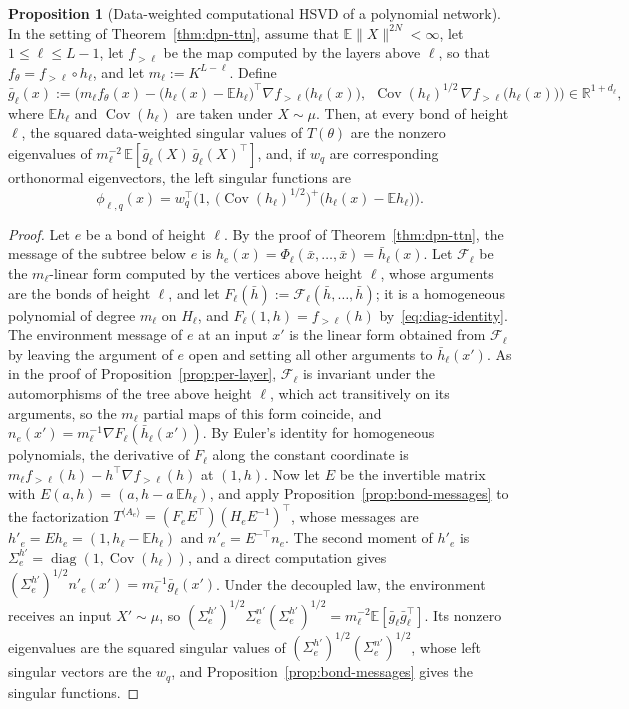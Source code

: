 \documentclass[11pt]{article}
\newcommand{\diag}{\operatorname{diag}}
\newcommand{\R}{\mathbb{R}}
\newcommand{\E}{\mathbb{E}}
\newcommand{\norm}[1]{\lVert #1\rVert}
\newcommand{\xb}{\bar{x}}
\newcommand{\hb}{\bar{h}}
\newcommand{\Cov}{\operatorname{Cov}}
\theoremstyle{definition}
\newtheorem{proposition}[theorem]{Proposition}
\numberwithin{equation}{section}
\begin{document}
\begin{proposition}[Data-weighted computational HSVD of a polynomial network]\label{prop:dpn-agop}
In the setting of Theorem~\ref{thm:dpn-ttn}, assume that $\E\norm{X}^{2N}<\infty$, let $1\le\ell\le L-1$, let $f_{>\ell}$ be the map computed by the layers above $\ell$, so that $f_\theta=f_{>\ell}\circ h_\ell$, and let $m_\ell:=K^{L-\ell}$. Define
\[
\bar g_\ell(x):=\Big(m_\ell f_\theta(x)-\big(h_\ell(x)-\E h_\ell\big)^\top\nabla f_{>\ell}\big(h_\ell(x)\big),\ \ \Cov(h_\ell)^{1/2}\,\nabla f_{>\ell}\big(h_\ell(x)\big)\Big)\in\R^{1+d_\ell},
\]
where $\E h_\ell$ and $\Cov(h_\ell)$ are taken under $X\sim\mu$. Then, at every bond of height $\ell$, the squared data-weighted singular values of $T(\theta)$ are the nonzero eigenvalues of $m_\ell^{-2}\,\E[\bar g_\ell(X)\,\bar g_\ell(X)^\top]$, and, if $w_q$ are corresponding orthonormal eigenvectors, the left singular functions are
\[
\phi_{\ell,q}(x)=w_q^\top\Big(1,\ \big(\Cov(h_\ell)^{1/2}\big)^+\big(h_\ell(x)-\E h_\ell\big)\Big).
\]
\end{proposition}

\begin{proof}
Let $e$ be a bond of height $\ell$. By the proof of Theorem~\ref{thm:dpn-ttn}, the message of the subtree below $e$ is $h_e(x)=\Phi_\ell(\xb,\dots,\xb)=\hb_\ell(x)$. Let $\mathcal F_\ell$ be the $m_\ell$-linear form computed by the vertices above height $\ell$, whose arguments are the bonds of height $\ell$, and let $F_\ell(\bar h):=\mathcal F_\ell(\bar h,\dots,\bar h)$; it is a homogeneous polynomial of degree $m_\ell$ on $H_\ell$, and $F_\ell(1,h)=f_{>\ell}(h)$ by~\eqref{eq:diag-identity}. The environment message of $e$ at an input $x'$ is the linear form obtained from $\mathcal F_\ell$ by leaving the argument of $e$ open and setting all other arguments to $\hb_\ell(x')$. As in the proof of Proposition~\ref{prop:per-layer}, $\mathcal F_\ell$ is invariant under the automorphisms of the tree above height $\ell$, which act transitively on its arguments, so the $m_\ell$ partial maps of this form coincide, and $n_e(x')=m_\ell^{-1}\nabla F_\ell(\hb_\ell(x'))$. By Euler's identity for homogeneous polynomials, the derivative of $F_\ell$ along the constant coordinate is $m_\ell f_{>\ell}(h)-h^\top\nabla f_{>\ell}(h)$ at $(1,h)$. Now let $E$ be the invertible matrix with $E(a,h)=(a,h-a\,\E h_\ell)$, and apply Proposition~\ref{prop:bond-messages} to the factorization $T^{\langle A_e\rangle}=(F_eE^\top)(H_eE^{-1})^\top$, whose messages are $h'_e=Eh_e=(1,h_\ell-\E h_\ell)$ and $n'_e=E^{-\top}n_e$. The second moment of $h'_e$ is $\Sigma^{h'}_e=\diag(1,\Cov(h_\ell))$, and a direct computation gives $(\Sigma^{h'}_e)^{1/2}n'_e(x')=m_\ell^{-1}\bar g_\ell(x')$. Under the decoupled law, the environment receives an input $X'\sim\mu$, so $(\Sigma^{h'}_e)^{1/2}\Sigma^{n'}_e(\Sigma^{h'}_e)^{1/2}=m_\ell^{-2}\E[\bar g_\ell\bar g_\ell^\top]$. Its nonzero eigenvalues are the squared singular values of $(\Sigma^{h'}_e)^{1/2}(\Sigma^{n'}_e)^{1/2}$, whose left singular vectors are the $w_q$, and Proposition~\ref{prop:bond-messages} gives the singular functions.
\end{proof}
\end{document}
